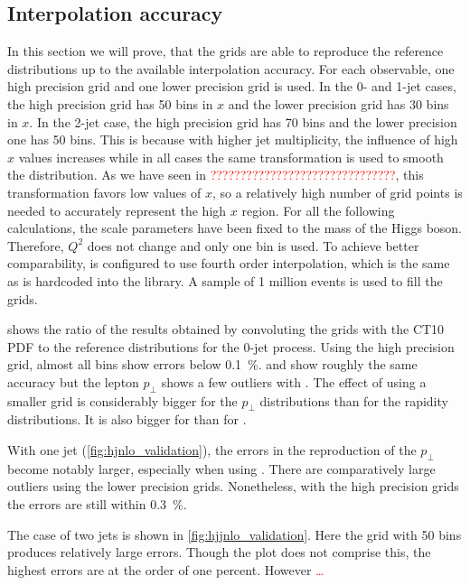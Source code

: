 \subsection{Interpolation accuracy}
In this section we will prove, that the grids are able to reproduce the reference distributions up to the available interpolation accuracy.
For each observable, one high precision grid and one lower precision grid is used.
In the 0- and 1-jet cases, the high precision grid has \num{50} bins in $x$ and the lower precision grid has \num{30} bins in $x$.
In the 2-jet case, the high precision grid has \num{70} bins and the lower precision one has \num{50} bins.
This is because with higher jet multiplicity, the influence of high $x$ values increases while in all cases the same transformation is used to smooth the distribution.
As we have seen in \textcolor{red}{???????????????????????????????}, this transformation favors low values of $x$, so a relatively high number of grid points is needed to accurately represent the high $x$ region.
For all the following calculations, the scale parameters have been fixed to the mass of the Higgs boson.
Therefore, $Q^2$ does not change and only one bin is used.
To achieve better comparability, \appl{} is configured to use fourth order interpolation, which is the same as is hardcoded into the \fnlo{} library.
A sample of \num{1} million events is used to fill the grids.

 shows the ratio of the results obtained by convoluting the grids with the CT10 PDF to the reference distributions for the 0-jet process.
Using the high precision grid, almost all bins show errors below \SI{0.1}{\percent}.
\appl{} and \fnlo{} show roughly the same accuracy but the lepton $p_\perp$ shows a few outliers with \fnlo{}.
The effect of using a smaller grid is considerably bigger for the $p_\perp$ distributions than for the rapidity distributions.
It is also bigger for \appl{} than for \fnlo{}.

With one jet (\cref{fig:hjnlo_validation}), the errors in the reproduction of the $p_\perp$ become notably larger, especially when using \fnlo{}.
There are comparatively large outliers using the lower precision grids.
Nonetheless, with the high precision grids the errors are still within \SI{0.3}{\percent}.

The case of two jets is shown in \cref{fig:hjjnlo_validation}.
Here the grid with \num{50} bins produces relatively large errors.
Though the plot does not comprise this, the highest errors are at the order of one percent.
However \textcolor{red}{\ldots}



